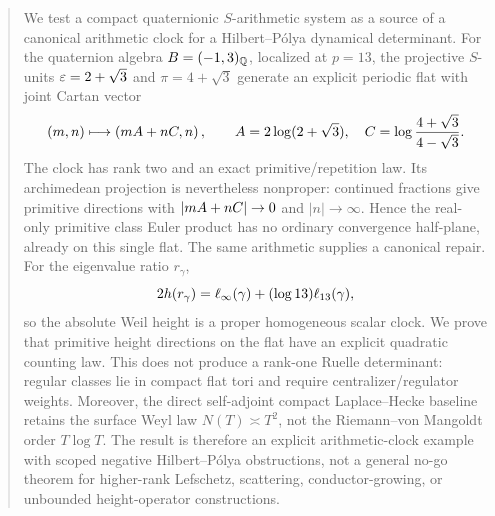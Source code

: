 \begin{abstract}
We test a compact quaternionic $S$-arithmetic system as a source of a
canonical arithmetic clock for a Hilbert--P\'olya dynamical determinant.  For
the quaternion algebra $B=(-1,3)_{\Q}$, localized at $p=13$, the projective
$S$-units $\eps=2+\sqrt3$ and $\pi=4+\sqrt3$ generate an explicit periodic
flat with joint Cartan vector
\[
(m,n)\longmapsto
\left(m\cA+n\cC,n\right),\qquad
\cA=2\log(2+\sqrt3),\quad
\cC=\log\frac{4+\sqrt3}{4-\sqrt3}.
\]
The clock has rank two and an exact primitive/repetition law.  Its
archimedean projection is nevertheless nonproper: continued fractions give
primitive directions with $|m\cA+n\cC|\to0$ and $|n|\to\infty$.  Hence the
real-only primitive class Euler product has no ordinary convergence
half-plane, already on this single flat.  The same arithmetic supplies a
canonical repair.  For the eigenvalue ratio $r_\gamma$,
\[
2h(r_\gamma)=\ellinf(\gamma)+(\log13)\ellp(\gamma),
\]
so the absolute Weil height is a proper homogeneous scalar clock.  We prove
that primitive height directions on the flat have an explicit quadratic
counting law.  This does not produce a rank-one Ruelle determinant: regular
classes lie in compact flat tori and require centralizer/regulator weights.
Moreover, the direct self-adjoint compact Laplace--Hecke baseline retains the
surface Weyl law $N(T)\asymp T^2$, not the Riemann--von Mangoldt order
$T\log T$.  The result is therefore an explicit arithmetic-clock example
with scoped negative Hilbert--P\'olya obstructions, not a general no-go theorem
for higher-rank Lefschetz, scattering, conductor-growing, or unbounded
height-operator constructions.
\end{abstract}

